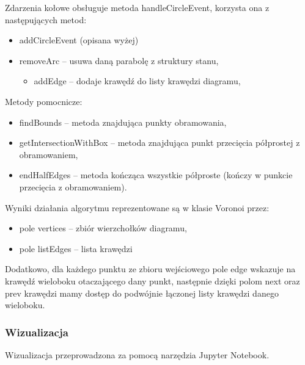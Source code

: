 \documentclass{article}
\begin{document}
\begin{enumerate}
\begin{itemize}
    \end{itemize}
    Zdarzenia kołowe obsługuje metoda handleCircleEvent, korzysta ona z następujących metod:
    \begin{itemize}
        \item addCircleEvent (opisana wyżej)
        \item removeArc – usuwa daną parabolę z struktury stanu,
        \begin{itemize}
            \item addEdge – dodaje krawędź do listy krawędzi diagramu,
        \end{itemize}
    \end{itemize}
    
    Metody pomocnicze:
    \begin{itemize}
        \item findBounds – metoda znajdująca punkty obramowania,
        \item getIntersectionWithBox – metoda znajdująca punkt przecięcia półprostej z obramowaniem,
        \item endHalfEdges – metoda kończąca wszystkie półproste (kończy w punkcie przecięcia z obramowaniem).

    \end{itemize}
    
    \newline
    Wyniki działania algorytmu reprezentowane są w klasie Voronoi przez:
    
    \begin{itemize}
        \item pole vertices – zbiór wierzchołków diagramu,
        \item pole listEdges – lista krawędzi
    \end{itemize}
Dodatkowo, dla każdego punktu ze zbioru wejściowego pole edge wskazuje na krawędź wieloboku otaczającego dany punkt, następnie dzięki polom next oraz prev krawędzi mamy dostęp do podwójnie łączonej listy krawędzi danego wieloboku.

    
\end{enumerate}
\subsubsection{Wizualizacja}
Wizualizacja przeprowadzona za pomocą narzędzia Jupyter Notebook.
\end{document}
